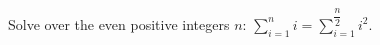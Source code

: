 Solve over the even positive integers $n$: $\displaystyle\sum_{i=1}^{n}i=\sum_{i=1}^{\dfrac n2}i^2$.

